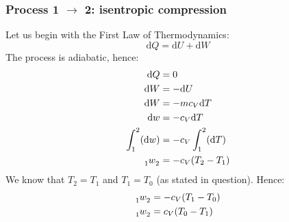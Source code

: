 \documentclass[12pt]{article}
\numberwithin{equation}{section}
\begin{document}
\begin{flushleft}
\subsubsection*{Process 1 $\rightarrow$ 2: isentropic compression}
Let us begin with the First Law of Thermodynamics:
\begin{equation}
  \mathrm{d}Q = \mathrm{d}U + \mathrm{d}W
\end{equation}
The process is adiabatic, hence:
\begin{align}
  \mathrm{d}Q &= 0\\
  \mathrm{d}W &= - \mathrm{d}U\\
  \mathrm{d}W &= -m c_V \mathrm{d}T\\
  \mathrm{d}w &= - c_V \mathrm{d}T\\
  \int_1^2(\mathrm{d}w) &= -c_V \int_1^2(\mathrm{d}T)\\
  \tensor[_1]{w}{_2} &= -c_V (T_2 - T_1)\\
\end{align}
We know that $T_2 = T_1$ and $T_1 = T_0$ (as stated in question). Hence:
\begin{align}
  \tensor[_1]{w}{_2} &= -c_V (T_1 - T_0)\\
  \tensor[_1]{w}{_2} &= c_V (T_0 - T_1)
\end{align}


\end{flushleft}
\end{document}
